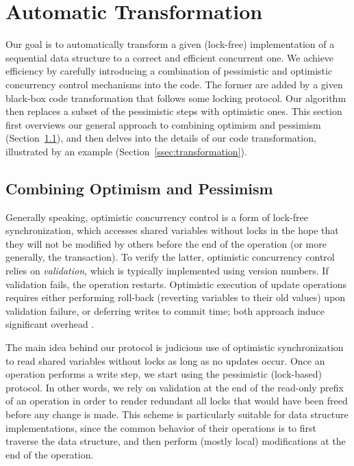 \section{Automatic Transformation}\label{sec:algorithm}

Our goal is to automatically transform a given (lock-free) implementation of a sequential data structure to a correct and efficient concurrent one.
We achieve efficiency by carefully introducing a combination of pessimistic and optimistic concurrency control mechanisms into the code. The former are 
added by a given black-box code transformation that follows some locking protocol. Our algorithm then replaces a subset of the pessimistic
steps with optimistic ones. This section first overviews our general approach to combining optimism and pessimism (Section~\ref{ssec:overview}), and
then delves into the details of our code transformation, illustrated by an example (Section~\ref{ssec:transformation}).

\subsection{Combining Optimism and Pessimism}\label{ssec:overview}

Generally speaking, optimistic concurrency control is a form of lock-free synchronization, which accesses shared variables without locks in the hope that they will not be modified by others before the end of the operation (or more generally, the transaction). To verify the latter, optimistic concurrency control relies on \emph{validation}, which is typically implemented using version numbers. If validation fails, the operation restarts. Optimistic execution of update operations requires either performing roll-back (reverting variables to their old values) upon validation failure, or deferring writes to commit time; both approach induce significant overhead . 


The main idea behind our protocol is judicious use of optimistic synchronization to read 
shared variables without locks as long as no updates occur. Once an operation
performs a write step, we start using the pessimistic (lock-based) protocol. In
other words, we rely on validation at the end of the read-only prefix of an operation in order to render redundant all locks that would have been freed
before any change is made.
This scheme is particularly suitable for data structure implementations,
since the common behavior of their operations 
is to first traverse the data structure, and then 
perform (mostly local) modifications at the end of the operation.


